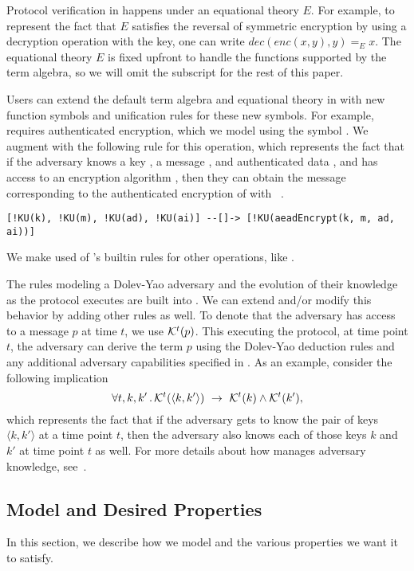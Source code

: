 Protocol verification in \mTamarin{} happens under an equational theory $E$.
%
For example, to represent the fact that $E$ satisfies the reversal of
symmetric encryption by using a decryption operation with the key,
one can write $\textit{dec}(\textit{enc}(x, y), y) =_{E} x$.
%
The equational theory $E$ is fixed upfront to handle the functions supported 
by
the term algebra, so we will omit the subscript for the rest of this paper.
%

Users can extend the default term algebra and equational theory in
\mTamarin{} with new function symbols and unification rules for these new 
symbols.
%
For example, \mEdhoc{} requires authenticated encryption, which we model 
using
the symbol .
%
We augment \mTamarin{} with the following rule for this operation,
which represents the fact that if the adversary knows a key ,
a message , and authenticated data ,
and has access to an encryption algorithm ,
then they can obtain the message corresponding to the authenticated 
encryption
of  with ~\cite{Norr21}.
%
\begin{verbatim}
[!KU(k), !KU(m), !KU(ad), !KU(ai)] --[]-> [!KU(aeadEncrypt(k, m, ad, ai))]
\end{verbatim}
%
We make used of \mTamarin{}'s builtin rules for other operations, like 
\mXor{}.
%

The rules modeling a Dolev-Yao adversary and the evolution of their 
knowledge
as the protocol executes are built into \mTamarin.
%
We can extend and/or modify this behavior by adding other rules as well.
%
To denote that the adversary has access to a message $p$ at time $t$, we use 
$\mathcal{K}^{t}(p)$.
%
This 
executing the protocol, at time point $t$, the adversary can derive the
term $p$ using the Dolev-Yao deduction rules and any additional adversary
capabilities specified in \mTamarin.
%
As an example, consider the following implication
\[
    \forall t, k, k'\operatorname{.} \mathcal{K}^{t}(\langle k, k'\rangle)\ \rightarrow\
\mathcal{K}^{t}(k) \land \mathcal{K}^{t}(k'),
\]
which represents the fact that if the adversary gets to know the pair of
keys $\langle k, k' \rangle$ at a time point $t$, then the adversary also
knows each of those keys $k$ and $k'$ at time point $t$ as well.
%
For more details about how \mTamarin{} manages adversary knowledge,
see~\cite{DBLP:conf/cav/MeierSCB13}.
%

\subsection{Model and Desired Properties}
\label{sec:desired-properties}
In this section, we describe how we model \mEdhoc{} and the various 
properties
we want it to satisfy.
%

